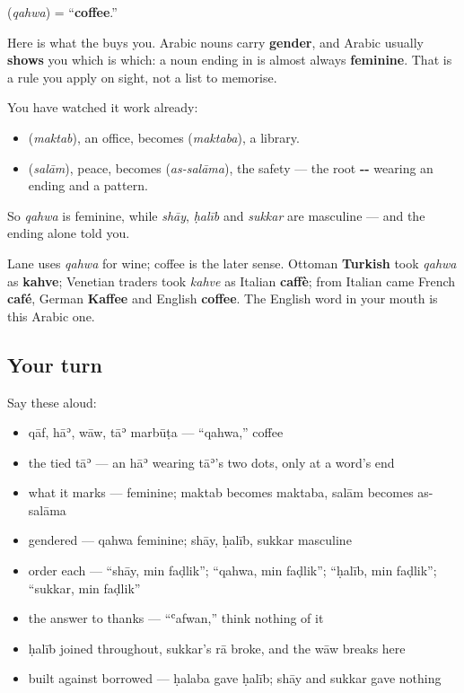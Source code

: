 \begin{cousinweb}
\textbf{} (\emph{qahwa}) = \textquotedblleft{}\textbf{coffee}.\textquotedblright{}

Here is what the \textbf{} buys you. Arabic nouns carry \textbf{gender}, and Arabic usually \textbf{shows} you which is which: a noun ending in \textbf{} is almost always \textbf{feminine}. That is a rule you apply on sight, not a list to memorise.

You have watched it work already:

\begin{itemize}
\raggedright
  \item \textbf{} (\emph{maktab}), an office, becomes \textbf{} (\emph{maktaba}), a library.
  \item \textbf{} (\emph{salām}), peace, becomes \textbf{} (\emph{as-salāma}), the safety — the root \textbf{--} wearing an ending and a pattern.
\end{itemize}

So \emph{qahwa} is feminine, while \emph{shāy}, \emph{ḥalīb} and \emph{sukkar} are masculine — and the ending alone told you.

Lane uses \emph{qahwa} for wine; coffee is the later sense. Ottoman \textbf{Turkish} took \emph{qahwa} as \textbf{kahve}; Venetian traders took \emph{kahve} as Italian \textbf{caffè}; from Italian came French \textbf{café}, German \textbf{Kaffee} and English \textbf{coffee}. The English word in your mouth is this Arabic one.
\end{cousinweb}

\subsection*{Your turn}
Say these aloud:

\begin{itemize}
\raggedright
  \item qāf, hāʾ, wāw, tāʾ marbūṭa — \textquotedblleft{}qahwa,\textquotedblright{} coffee
  \item the tied tāʾ — an hāʾ wearing tāʾ's two dots, only at a word's end
  \item what it marks — feminine; maktab becomes maktaba, salām becomes as-salāma
  \item gendered — qahwa feminine; shāy, ḥalīb, sukkar masculine
  \item order each — \textquotedblleft{}shāy, min faḍlik\textquotedblright{}; \textquotedblleft{}qahwa, min faḍlik\textquotedblright{}; \textquotedblleft{}ḥalīb, min faḍlik\textquotedblright{}; \textquotedblleft{}sukkar, min faḍlik\textquotedblright{}
  \item the answer to thanks — \textquotedblleft{}ʿafwan,\textquotedblright{} think nothing of it
  \item ḥalīb joined throughout, sukkar's rā broke, and the wāw breaks here
  \item built against borrowed — ḥalaba gave ḥalīb; shāy and sukkar gave nothing
\end{itemize}

